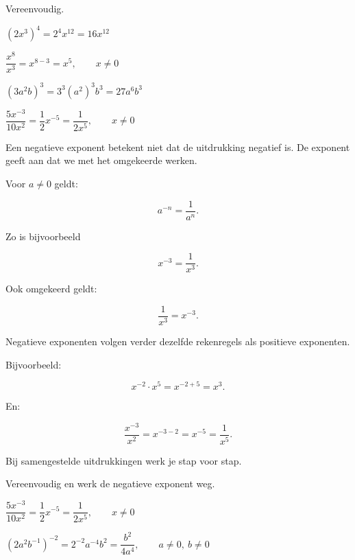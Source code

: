 \documentclass{ximera}
\begin{document}
\begin{voorbeeld}

  Vereenvoudig.
  
  \begin{question}
  \((2x^3)^4
  =
  2^4x^{12}
  =
  16x^{12}\)
  \end{question}
  
  \begin{question}
  \(\dfrac{x^8}{x^3}
  =
  x^{8-3}
  =
  x^5,
  \qquad x\neq0\)
  \end{question}
  
  \begin{question}
  \((3a^2b)^3
  =
  3^3(a^2)^3b^3
  =
  27a^6b^3\)
  \end{question}
  
  \begin{question}
  \(\dfrac{5x^{-3}}{10x^2}
  =
  \dfrac12x^{-5}
  =
  \dfrac{1}{2x^5},
  \qquad x\neq0\)
  \end{question}
  
  \end{voorbeeld}



  Een negatieve exponent betekent niet dat de uitdrukking negatief is.
  De exponent geeft aan dat we met het omgekeerde werken.
  
  Voor \(a\neq0\) geldt:
  
  \[
  a^{-n}=\frac{1}{a^n}.
  \]
  
  Zo is bijvoorbeeld
  
  \[
  x^{-3}=\frac1{x^3}.
  \]
  
  Ook omgekeerd geldt:
  
  \[
  \frac1{x^3}=x^{-3}.
  \]
  
  Negatieve exponenten volgen verder dezelfde rekenregels als positieve exponenten.
  
  Bijvoorbeeld:
  
  \[
  x^{-2}\cdot x^5
  =
  x^{-2+5}
  =
  x^3.
  \]
  
  En:
  
  \[
  \frac{x^{-3}}{x^2}
  =
  x^{-3-2}
  =
  x^{-5}
  =
  \frac1{x^5}.
  \]
  
  Bij samengestelde uitdrukkingen werk je stap voor stap.
  
  \begin{voorbeeld}
  
  Vereenvoudig en werk de negatieve exponent weg.
  
  \begin{question}
  \(\dfrac{5x^{-3}}{10x^2}
  =
  \dfrac12x^{-5}
  =
  \dfrac1{2x^5},
  \qquad x\neq0\)
  \end{question}
  
  \begin{question}
  \((2a^2b^{-1})^{-2}
  =
  2^{-2}a^{-4}b^2
  =
  \dfrac{b^2}{4a^4},
  \qquad a\neq0,\ b\neq0\)
  \end{question}
  
  \end{voorbeeld}
  
\end{document}
